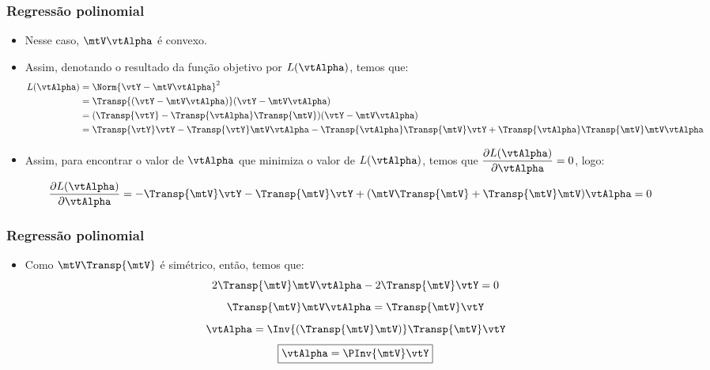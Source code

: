 \begin{frame}
	\frametitle{Regressão polinomial}
	\begin{itemize}
		\item Nesse caso, $\mtV \vtAlpha$ é convexo.
		\item Assim, denotando o resultado da função objetivo por $L(\vtAlpha)$, temos que:
		\begin{align*}
			L(\vtAlpha) &= \Norm{\vtY - \mtV \vtAlpha}^2 \\
			&= \Transp{(\vtY - \mtV \vtAlpha)}(\vtY - \mtV \vtAlpha) \\
			&= (\Transp{\vtY} - \Transp{\vtAlpha} \Transp{\mtV})(\vtY - \mtV \vtAlpha) \\
			&= \Transp{\vtY}\vtY - \Transp{\vtY}\mtV\vtAlpha - \Transp{\vtAlpha}\Transp{\mtV}\vtY + \Transp{\vtAlpha}\Transp{\mtV}\mtV \vtAlpha
		\end{align*}
		\item Assim, para encontrar o valor de $\vtAlpha$ que minimiza o valor de $L(\vtAlpha)$, temos que \alert{$\dfrac{\partial L(\vtAlpha)}{\partial \vtAlpha} = 0$}, logo:
		\begin{align*}
			\dfrac{\partial L(\vtAlpha)}{\partial \vtAlpha} &= - \Transp{\mtV}\vtY - \Transp{\mtV}\vtY + (\mtV\Transp{\mtV} + \Transp{\mtV}\mtV)\vtAlpha = 0
		\end{align*}
	\end{itemize}
\end{frame}

\begin{frame}
	\frametitle{Regressão polinomial}
	\begin{itemize}
		\item Como $\mtV\Transp{\mtV}$ é simétrico, então, temos que:
		\[
			2\Transp{\mtV}\mtV\vtAlpha - 2\Transp{\mtV}\vtY = 0
		\]
		\[
			\Transp{\mtV}\mtV\vtAlpha = \Transp{\mtV}\vtY
		\]
		\[
			\vtAlpha = \Inv{\left(\Transp{\mtV}\mtV\right)}\Transp{\mtV}\vtY
		\]
		\[
			\boxed{\vtAlpha = \PInv{\mtV}\vtY}
		\]
	\end{itemize}
\end{frame}

